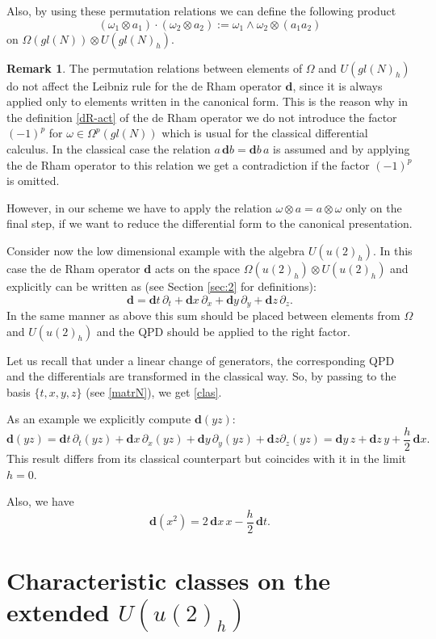 \documentclass[11pt]{article}
\newcommand{\pa}{\partial}
\newcommand{\ot}{\otimes}
\newcommand{\Om}{\Omega}
\newcommand{\om}{\omega}
\newcommand{\dd}{\mathbf{d}}
\numberwithin{equation}{section}
\theoremstyle{plain}
\theoremstyle{definition}
\newtheorem{remark}[theorem]{Remark}
\begin{document}
Also, by using these permutation relations  we can define the following product
\[
(\om_1\ot a_1)\cdot (\om_2\ot a_2):= \om_1\wedge \om_2\ot (a_1a_2)
\]
on $\Om(gl(N))\ot U(gl(N)_h)$.

\begin{remark}
The permutation relations between elements of $\Omega$ and $U(gl(N)_h)$ do not affect the Leibniz rule for the
de Rham operator $\dd$, since it is always applied only to elements written in the canonical form. This is the reason why
in the definition \eqref{dR-act} of the de Rham operator we do not introduce the factor $(-1)^p$ for $\om\in \Om^p(gl(N))$ which
is usual for the classical differential calculus.
In the classical case the relation $a\, \dd b=\dd b\, a$ is assumed and by applying the de Rham operator to this relation we get a contradiction if the factor 
$(-1)^p$ is omitted. 

However, in our scheme we have to apply the relation $\om\ot a=a\ot \om$ only on the final step, if we want to reduce the differential form to the canonical presentation.
\end{remark}

Consider now the low dimensional example with the algebra $U(u(2)_h)$. In this case the de Rham operator $\dd$ acts on
the space $\Om(u(2)_h)\ot  U(u(2)_h)$ and explicitly can be written as (see Section \ref{sec:2} for definitions):
\begin{equation}
\dd=\dd t \, \pa_t+\dd x \,\pa_x+\dd y\, \pa_y+\dd z\, \pa_z.
\label{clas}
\end{equation}
In the same manner as above this sum should be placed between elements from $\Om$ and $U(u(2)_h)$ and the QPD should be
applied to the right factor.

Let us recall that under a linear change of generators, the corresponding QPD and the differentials are  transformed in the classical way.
So, by passing to the basis $\{t, x, y, z\}$  (see \ref{matrN}), we get \eqref{clas}.

As an example  we explicitly compute $\dd(yz)$:
\[
\dd(yz)=\dd t \, \pa_t(yz)+\dd x \,\pa_x(yz)+\dd y\, \pa_y(yz)+\dd z \pa_z(yz)=
\dd y\, z+\dd z \, y +\frac{h}{2}\, \dd x.
\]
This result differs from its classical counterpart but coincides with it in the limit $h=0$.

Also, we have
\[
\dd(x^2)=2 \, \dd x\, x-\frac{h}{2}\, \dd t.
\]

\section[Characteristic classes on the extended U(u(2)h)]{Characteristic classes on the extended $U(u(2)_h)$}\label{sec:characteristic}
\end{document}
